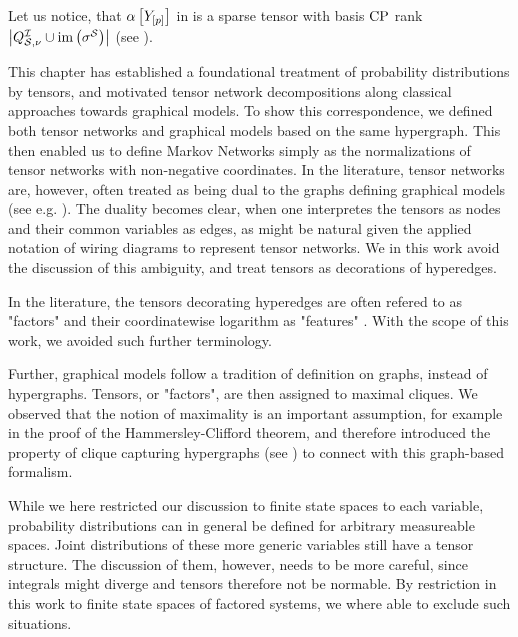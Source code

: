 Let us notice, that $\alpha\left[Y_{[p]}\right]$ in  is a sparse tensor with basis $\mathrm{CP}$ rank $\left|Q^{\mathcal{I}}_{\mathcal{S},\nu}\cup\mathrm{im}\left(\sigma^{\mathcal{S}}\right)\right|$ (see ).



This chapter has established a foundational treatment of probability distributions by tensors, and motivated tensor network decompositions along classical approaches towards graphical models.
To show this correspondence, we defined both tensor networks and graphical models based on the same hypergraph.
This then enabled us to define Markov Networks simply as the normalizations of tensor networks with non-negative coordinates.
In the literature, tensor networks are, however, often treated as being dual to the graphs defining graphical models (see e.g. \cite{robeva_duality_2019}).
The duality becomes clear, when one interpretes the tensors as nodes and their common variables as edges, as might be natural given the applied notation of wiring diagrams to represent tensor networks.
We in this work avoid the discussion of this ambiguity, and treat tensors as decorations of hyperedges.

In the literature, the tensors decorating hyperedges are often refered to as "factors" and their coordinatewise logarithm as "features" \cite{koller_probabilistic_2009}.
With the scope of this work, we avoided such further terminology.

Further, graphical models follow a tradition of definition on graphs, instead of hypergraphs.
Tensors, or "factors", are then assigned to maximal cliques.
We observed that the notion of maximality is an important assumption, for example in the proof of the Hammersley-Clifford theorem, and therefore introduced the property of clique capturing hypergraphs (see ) to connect with this graph-based formalism.

While we here restricted our discussion to finite state spaces to each variable, probability distributions can in general be defined for arbitrary measureable spaces.
Joint distributions of these more generic variables still have a tensor structure.
The discussion of them, however, needs to be more careful, since integrals might diverge and tensors therefore not be normable.
By restriction in this work to finite state spaces of factored systems, we where able to exclude such situations.








